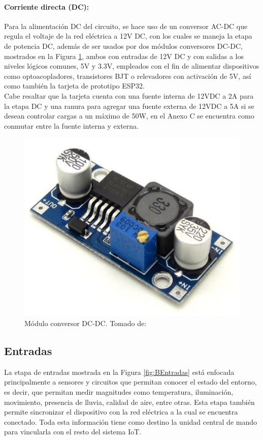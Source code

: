 	\paragraph{Corriente directa (DC):}
		Para la alimentación DC del circuito, se hace uso de un conversor AC-DC que regula el voltaje de la red eléctrica a 12V DC, con los cuales se maneja la etapa de potencia DC, además de ser usados por dos módulos conversores DC-DC, mostrados en la Figura \ref{fig:DCDC}, ambos con entradas de 12V DC y con salidas a los niveles lógicos comunes, 5V y 3.3V, empleados con el fin de alimentar dispositivos como optoacopladores, transistores BJT o relevadores con activación de 5V, así como también la tarjeta de prototipo ESP32.\\
		
		Cabe resaltar que la tarjeta cuenta con una fuente interna de 12VDC a 2A para la etapa DC y una ranura para agregar una fuente externa de 12VDC a 5A si se desean controlar cargas a un máximo de 50W, en el Anexo C se encuentra como conmutar entre la fuente interna y externa.\\
			
		\begin{figure}[H]
			\centering
			\caption[Módulo conversor DC-DC.]{Módulo conversor DC-DC. Tomado de: \cite{DCDC}}
			\label{fig:DCDC}
			\includegraphics[width=0.5\linewidth]{Imagenes/DCDC}
		\end{figure}
	
	\subsection{Entradas}
	
	La etapa de entradas mostrada en la Figura \ref{fig:BEntradas} está enfocada principalmente a sensores y circuitos que permitan conocer el estado del entorno, es decir, que permitan medir magnitudes como temperatura, iluminación, movimiento, presencia de lluvia, calidad de aire, entre otras. Esta etapa también permite sincronizar el dispositivo con la red eléctrica a la cual se encuentra conectado. Toda esta información tiene como destino la unidad central de mando para vincularla con el resto del sistema IoT.
	

